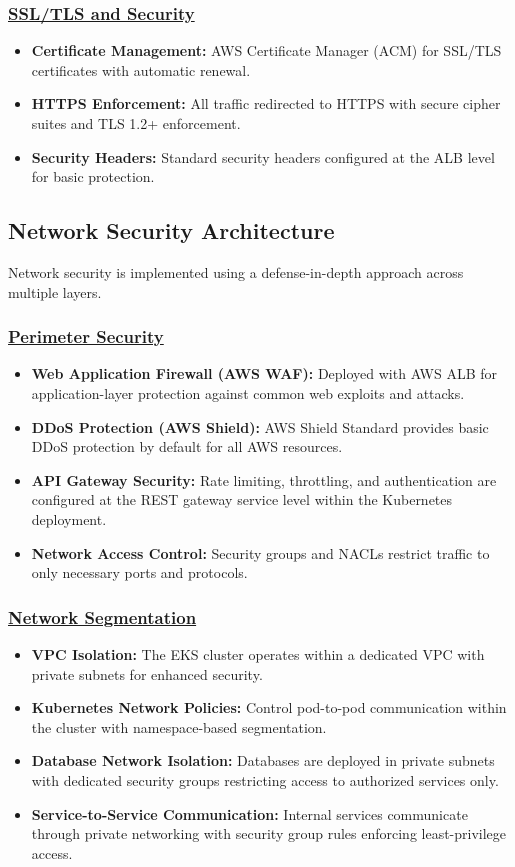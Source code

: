 \subsubsection*{\underline{SSL/TLS and Security}}
\begin{itemize}
    \item \textbf{Certificate Management:} AWS Certificate Manager (ACM) for SSL/TLS certificates with automatic renewal.
    \item \textbf{HTTPS Enforcement:} All traffic redirected to HTTPS with secure cipher suites and TLS 1.2+ enforcement.
    \item \textbf{Security Headers:} Standard security headers configured at the ALB level for basic protection.
\end{itemize}

\subsection{Network Security Architecture}
Network security is implemented using a defense-in-depth approach across multiple layers.

\subsubsection*{\underline{Perimeter Security}}
\begin{itemize}
    \item \textbf{Web Application Firewall (AWS WAF):} Deployed with AWS ALB for application-layer protection against common web exploits and attacks.
    \item \textbf{DDoS Protection (AWS Shield):} AWS Shield Standard provides basic DDoS protection by default for all AWS resources.
    \item \textbf{API Gateway Security:} Rate limiting, throttling, and authentication are configured at the REST gateway service level within the Kubernetes deployment.
    \item \textbf{Network Access Control:} Security groups and NACLs restrict traffic to only necessary ports and protocols.
\end{itemize}

\subsubsection*{\underline{Network Segmentation}}
\begin{itemize}
    \item \textbf{VPC Isolation:} The EKS cluster operates within a dedicated VPC with private subnets for enhanced security.
    \item \textbf{Kubernetes Network Policies:} Control pod-to-pod communication within the cluster with namespace-based segmentation.
    \item \textbf{Database Network Isolation:} Databases are deployed in private subnets with dedicated security groups restricting access to authorized services only.
    \item \textbf{Service-to-Service Communication:} Internal services communicate through private networking with security group rules enforcing least-privilege access.
\end{itemize}

